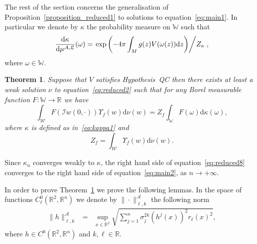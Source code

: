 \documentclass[a4paper,10pt]{article}
\newcommand{\mathd}{\mathrm{d}}
\newtheorem{theorem}{Theorem}
\begin{document}
The rest of the section concerns the generalisation of
Proposition~\ref{proposition_reduced1} to solutions to
equation~{\eqref{eq:main1}}. In particular we denote by $\kappa$ the
probability measure on $\mathbb{W}$ such that
\begin{equation}
  \frac{\mathd \kappa}{\mathd \mu^{\mathfrak{\mathcal{A}, L}}} (\omega) =
  \left. \exp \left( - 4 \pi \int_M g (z) V (\omega (z)) \mathd z \right)
  \middle/ Z_{\kappa} \right. \label{eq:kappa2},
\end{equation}
where $\omega \in \mathbb{W}$.

\begin{theorem}
  \label{theorem_main}Suppose that $V$ satisfies Hypothesis~QC then there
  exists at least a weak solution $\nu$ to equation~{\eqref{eq:reduced2}} such
  that for any Borel measurable function $F : \mathbb{W} \rightarrow
  \mathbb{R}$ we have
  \begin{equation}
    \int_{\mathcal{W}} F (\mathcal{} \mathcal{I} w (0, \cdot)) \Upsilon_f (w)
    \mathd \nu (w) = Z_f \int_{\mathbb{W}} F (\omega) \mathd \kappa (\omega)
    \label{eq:main2},
  \end{equation}
  where $\kappa$ is defined as in~{\eqref{eq:kappa1}} and
  \[ Z_f = \int_{\mathcal{W}} \Upsilon_f (w) \mathd \nu (w) . \]
\end{theorem}

\begin{remark}
  Since $\kappa_n$ converges weakly to $\kappa$, the right hand side of
  equation~{\eqref{eq:reduced8}} converges to the right hand side of
  equation~{\eqref{eq:main2}}, as $n \rightarrow + \infty$. 
\end{remark}

In order to prove Theorem~\ref{theorem_main} we prove the following lemmas. In
the space of functions $C^0_{\ell} (\mathbb{R}^2, \mathbb{R}^n)$ we denote by
$\| \cdot \|^{\mathcal{A}}_{\ell, k}$ the following norm
\begin{eqnarray}
  \| h \|^{\mathcal{A}}_{\ell, k} & = & \sup_{x \in \mathbb{R}^2}
  \sqrt{\sum_{j = 1}^n \sigma_j^{2 k} (h^j (x))^2 r_{\ell} (x)^2}, \nonumber
\end{eqnarray}
where $h \in C^0 (\mathbb{R}^2, \mathbb{R}^n)$ and $k, \ell \in \mathbb{R}$.
\end{document}
